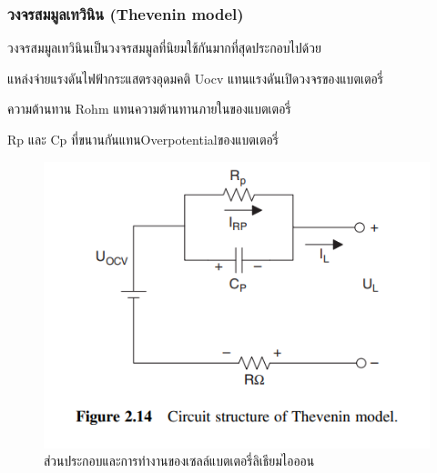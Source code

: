 \subsubsection*{วงจรสมมูลเทวินิน (Thevenin model)}
วงจรสมมูลเทวินินเป็นวงจรสมมูลที่นิยมใช้กันมากที่สุดประกอบไปด้วย
\begin{itemize}
{\item 	แหล่งจ่ายแรงดันไฟฟ้ากระแสตรงอุดมคติ Uocv แทนแรงดันเปิดวงจรของแบตเตอรี่}
{\item 	ความต้านทาน Rohm แทนความต้านทานภายในของแบตเตอรี่}
{\item 	Rp และ Cp ที่ขนานกันแทนOverpotentialของแบตเตอรี่}
\end{itemize}
\begin{center}
	\begin{figure}[!h]
		\includegraphics[width=0.6\linewidth]{Chapters/img/Thevenin_model.png}
			\centering
			\captionsetup{justification=centering,margin=2cm}
			\caption{ส่วนประกอบและการทำงานของเซลล์แบตเตอรี่ลิเธียมไอออน}
	\end{figure}
\end{center}
